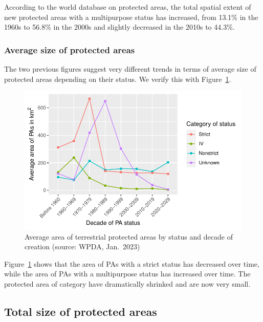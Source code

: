 \documentclass[
  letterpaper,
  DIV=11,
  numbers=noendperiod]{scrartcl}
\begin{document}
According to the world database on protected areas, the total spatial
extent of new protected areas with a multipurpose status has increased,
from 13.1\% in the 1960s to 56.8\% in the 2000s and slightly decreased
in the 2010s to 44.3\%.

\hypertarget{average-size-of-protected-areas}{%
\subsubsection{Average size of protected
areas}\label{average-size-of-protected-areas}}

The two previous figures suggest very different trends in terms of
average size of protected areas depending on their status. We verify
this with Figure~\ref{fig-avg-area}.

\begin{figure}

{\centering \includegraphics{Suppl_material_test_EoH_files/figure-pdf/fig-avg-area-1.pdf}

}

\caption{\label{fig-avg-area}Average area of terrestrial protected areas
by status and decade of creation (source: WPDA, Jan.~2023)}

\end{figure}

Figure~\ref{fig-avg-area} shows that the area of PAs with a strict
status has decreased over time, while the area of PAs with a
multipurpose status has increased over time. The protected area of
category have dramatically shrinked and are now very small.

\hypertarget{total-size-of-protected-areas}{%
\subsection{Total size of protected
areas}\label{total-size-of-protected-areas}}
\end{document}
